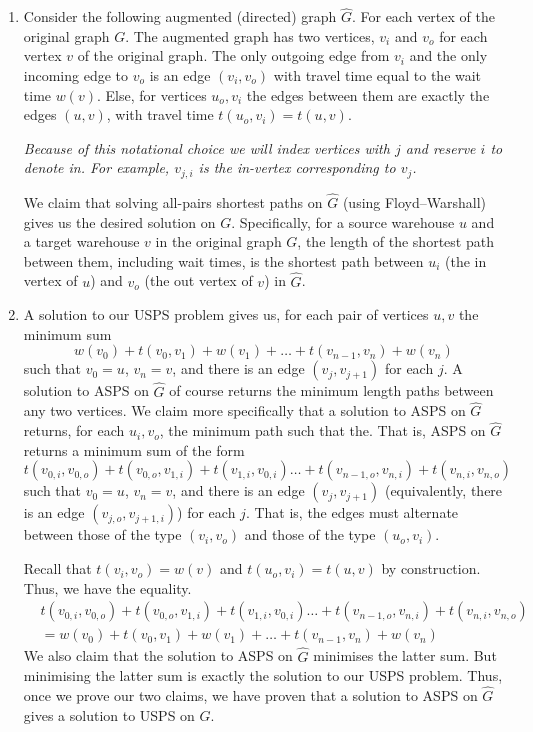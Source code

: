 \documentclass[12 pt, letterpaper]{hmcpset}
\begin{document}
\begin{solution}
	\begin{enumerate}
		\item Consider the following augmented (directed) graph $\hat{G}$. For each vertex of the original graph $G$. The augmented graph has two vertices, $v_{i}$ and $v_{o}$ for each vertex $v$ of the original graph. The only outgoing edge from $v_{i}$ and the only incoming edge to $v_{o}$ is an edge $(v_{i}, v_{o})$ with travel time equal to the wait time $w(v)$. Else, for vertices $u_{o}, v_{i}$ the edges between them are exactly the edges $(u, v)$, with travel time $t(u_{o}, v_{i}) = t(u, v)$.

			\emph{Because of this notational choice we will index vertices with $j$ and reserve $i$ to denote in. For example, $v_{j, i}$ is the in-vertex corresponding to $v_{j}$.}

			We claim that solving all-pairs shortest paths on $\hat{G}$ (using Floyd--Warshall) gives us the desired solution on $G$. Specifically, for a source warehouse $u$ and a target warehouse $v$ in the original graph $G$, the length of the shortest path between them, including wait times, is the shortest path between $u_{i}$ (the in vertex of $u$) and $v_{o}$ (the out vertex of $v$) in $\hat{G}$.

		\item A solution to our USPS problem gives us, for each pair of vertices $u, v$ the minimum sum
			\[
				w(v_{0}) + t(v_{0}, v_{1}) + w(v_{1}) + \dots + t(v_{n - 1}, v_{n}) + w(v_{n})
			\]
			such that $v_{0} = u$, $v_{n} = v$, and there is an edge $(v_{j}, v_{j + 1})$ for each $j$. A solution to ASPS on $\hat{G}$ of course returns the minimum length paths between any two vertices. We claim more specifically that a solution to ASPS on $\hat{G}$ returns, for each $u_{i}, v_{o}$, the minimum path such that the. That is, ASPS on $\hat{G}$ returns a minimum sum of the form
			\[
				t(v_{0, i}, v_{0, o}) + t(v_{0, o}, v_{1, i}) + t(v_{1, i}, v_{0, i}) \dots + t(v_{n - 1, o}, v_{n, i}) + t(v_{n, i}, v_{n, o})
			\]
			such that $v_{0} = u$, $v_{n} = v$, and there is an edge $(v_{j}, v_{j + 1})$ (equivalently, there is an edge $(v_{j, o}, v_{j + 1, i})$) for each $j$. That is, the edges must alternate between those of the type $(v_{i}, v_{o})$ and those of the type $(u_{o}, v_{i})$.

			Recall that $t(v_{i}, v_{o}) = w(v)$ and $t(u_{o}, v_{i}) = t(u, v)$ by construction. Thus, we have the equality.
			\begin{align*}
				& t(v_{0, i}, v_{0, o}) + t(v_{0, o}, v_{1, i}) + t(v_{1, i}, v_{0, i}) \dots + t(v_{n - 1, o}, v_{n, i}) + t(v_{n, i}, v_{n, o}) \\
				& = w(v_{0}) + t(v_{0}, v_{1}) + w(v_{1}) + \dots + t(v_{n - 1}, v_{n}) + w(v_{n})
			\end{align*}
			We also claim that the solution to ASPS on $\hat{G}$ minimises the latter sum. But minimising the latter sum is exactly the solution to our USPS problem. Thus, once we prove our two claims, we have proven that a solution to ASPS on $\hat{G}$ gives a solution to USPS on $G$.


\end{enumerate}
\end{solution}
\end{document}
